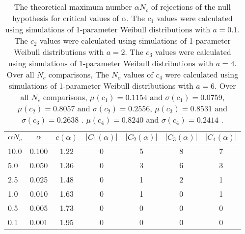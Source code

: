 \begin{table}[h!]
\begin{center}
\begin{tabular}{| l | c | c | c | c | c | c |}\hline
$\alpha N_c$ & $\alpha$ & $c(\alpha)$ & $|C_1(\alpha)|$ & $|C_2(\alpha)|$ & $|C_3(\alpha)|$ & $|C_4(\alpha)|$ \\\hline
10.0 & 0.100 & 1.22 & 0 & 5 & 8 & 7 \\\hline
5.0 & 0.050 & 1.36 & 0 & 3 & 6 & 3 \\\hline
2.5 & 0.025 & 1.48 & 0 & 1 & 2 & 1 \\\hline
1.0 & 0.010 & 1.63 & 0 & 1 & 0 & 1 \\\hline
0.5 & 0.005 & 1.73 & 0 & 0 & 0 & 0 \\\hline
0.1 & 0.001 & 1.95 & 0 & 0 & 0 & 0 \\\hline
\end{tabular}
\caption{The theoretical maximum number $\alpha N_c$ of rejections
of the null hypothesis for critical values of $\alpha$.
The $c_1$ values were calculated using simulations of 1-parameter Weibull distributions with $a=0.1$.
The $c_2$ values were calculated using simulations of 1-parameter Weibull distributions with $a=2$.
The $c_3$ values were calculated using simulations of 1-parameter Weibull distributions with $a=4$.
Over all $N_c$ comparisons,
The $N_o$ values of $c_4$ were calculated using simulations of
 1-parameter Weibull distributions with $a=6$.
Over all $N_c$ comparisons,
 $\mu(c_1)=0.1154$ and $\sigma(c_1)=0.0759$,
 $\mu(c_2)=0.8057$ and $\sigma(c_2)=0.2556$,
 $\mu(c_3)=0.8531$ and $\sigma(c_3)=0.2638$ .
 $\mu(c_4)=0.8240$ and $\sigma(c_4)=0.2414$ .
}
\end{center}
\end{table}